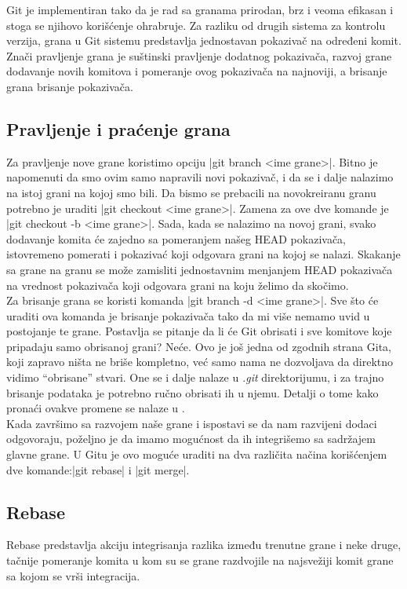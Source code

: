 \documentclass[a4paper]{article}
\begin{document}
{Git je implementiran tako da je rad sa granama prirodan, brz i veoma efikasan i stoga se njihovo korišćenje ohrabruje. Za razliku od drugih sistema za kontrolu verzija, grana u Git sistemu predstavlja jednostavan pokazivač na određeni komit. Znači pravljenje grana je suštinski pravljenje dodatnog pokazivača, razvoj grane dodavanje novih komitova i pomeranje ovog pokazivača na najnoviji, a brisanje grana brisanje pokazivača.

\subsection{Pravljenje i praćenje grana}
\label{subsec:pravljenje_grana}
Za pravljenje nove grane koristimo opciju |git branch <ime grane>|. Bitno je napomenuti da smo ovim samo napravili novi pokazivač, i da se i dalje nalazimo na istoj grani na kojoj smo bili. Da bismo se prebacili na novokreiranu granu potrebno je uraditi |git checkout <ime grane>|. Zamena za ove dve komande je |git checkout -b <ime grane>|. 
Sada, kada se nalazimo na novoj grani, svako dodavanje komita će zajedno sa pomeranjem našeg HEAD pokazivača, istovremeno pomerati i pokazivać koji odgovara grani na kojoj se nalazi. Skakanje sa grane na granu se može zamisliti jednostavnim menjanjem HEAD pokazivača na vrednost pokazivača koji odgovara grani na koju želimo da skočimo.\\

Za brisanje grana se koristi komanda |git branch -d <ime grane>|. Sve što će uraditi ova komanda je brisanje pokazivača tako da mi više nemamo uvid u postojanje te grane. Postavlja se pitanje da li će Git obrisati i sve komitove koje pripadaju samo obrisanoj grani? Neće. Ovo je još jedna od zgodnih strana Gita, koji zapravo ništa ne briše kompletno, već samo nama ne dozvoljava da direktno vidimo ``obrisane'' stvari. One se i dalje nalaze u \textit{.git} direktorijumu, i za trajno brisanje podataka je potrebno ručno obrisati ih u njemu. Detalji o tome kako pronaći ovakve promene se nalaze u \cite{progit}.\\

Kada završimo sa razvojem naše grane i ispostavi se da nam razvijeni dodaci odgovoraju, poželjno je da imamo mogućnost da ih integrišemo sa sadržajem glavne grane. U Gitu je ovo moguće uraditi na dva različita načina korišćenjem dve komande:|git rebase| i |git merge|.  

\subsection{Rebase}
\label{subsec:rebase}
Rebase predstavlja akciju integrisanja razlika između trenutne grane i neke druge, tačnije pomeranje komita u kom su se grane razdvojile na najsvežiji komit grane sa kojom se vrši integracija.\\

}
\end{document}
